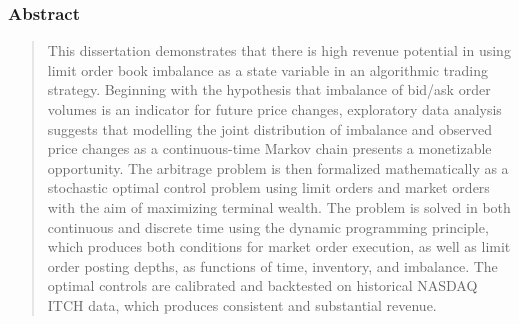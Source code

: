 \begin{frame}[plain]
\frametitle{Abstract}
\begin{quote}
{\scriptsize
This dissertation demonstrates that there is high revenue potential in using limit order book imbalance as a state variable in an algorithmic trading strategy. Beginning with the hypothesis that imbalance of bid/ask order volumes is an indicator for future price changes, exploratory data analysis suggests that modelling the joint distribution of imbalance and observed price changes as a continuous-time Markov chain presents a monetizable opportunity. The arbitrage problem is then formalized mathematically as a stochastic optimal control problem using limit orders and market orders with the aim of maximizing terminal wealth. The problem is solved in both continuous and discrete time using the dynamic programming principle, which produces both conditions for market order execution, as well as limit order posting depths, as functions of time, inventory, and imbalance. The optimal controls are calibrated and backtested on historical NASDAQ ITCH data, which produces consistent and substantial revenue.}
\end{quote}
\end{frame}

